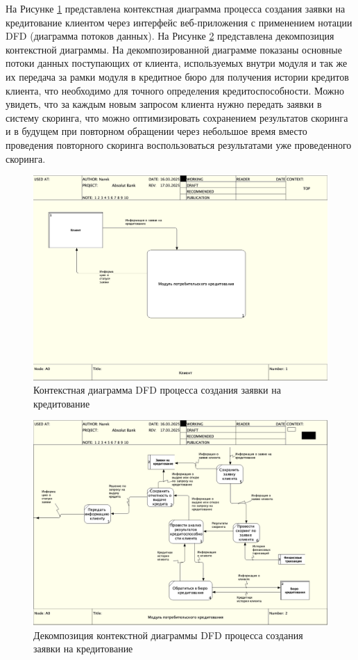 \documentclass[14pt, a4paper]{extarticle}
\begin{document}
На Рисунке \ref{fig:dfd0} представлена контекстная диаграмма
процесса создания заявки на кредитование клиентом через интерфейс
веб-приложения с применением нотации DFD (диаграмма потоков данных). На
Рисунке \ref{fig:dfd1} представлена декомпозиция контекстной диаграммы. На
декомпозированной диаграмме показаны основные потоки данных поступающих от
клиента, используемых внутри модуля и так же их передача за рамки модуля в
кредитное бюро для получения истории кредитов клиента, что необходимо для
точного определения кредитоспособности. Можно увидеть, что за каждым новым
запросом клиента нужно передать заявки в систему скоринга, что можно
оптимизировать сохранением результатов скоринга и в будущем при повторном
обращении через небольшое время вместо проведения повторного скоринга
воспользоваться результатами уже проведенного скоринга.

\begin{figure}[H]
	\centering
	\includegraphics[scale=0.33]{dfd0}
	\caption{Контекстная диаграмма DFD процесса создания заявки на кредитование}
	\label{fig:dfd0}
\end{figure}

\begin{figure}[H]
	\centering
	\includegraphics[scale=0.33]{dfd1}
	\caption{Декомпозиция контекстной диаграммы DFD процесса создания заявки на
		кредитование}
	\label{fig:dfd1}
\end{figure}
\end{document}
